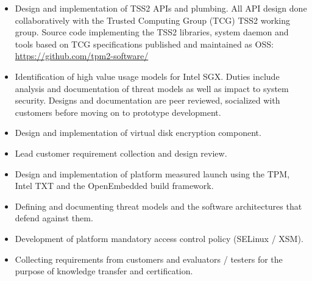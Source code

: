 \documentclass[letterpaper,11pt]{article}
\begin{document}
\begin {itemize}
  \setlength {\itemsep}{1pt}
  \setlength {\parskip}{0pt}
  \setlength {\parsep}{0pt}
  \item Design and implementation of TSS2 APIs and plumbing. All API
    design done collaboratively with the Trusted Computing Group (TCG)
    TSS2 working group. Source code implementing the TSS2 libraries,
    system daemon and tools based on TCG specifications published and
    maintained as OSS: \url{https://github.com/tpm2-software/}
  \item Identification of high value usage models for
    Intel\textsuperscript{\textregistered} SGX. Duties include analysis
    and documentation of threat models as well as impact to system
    security. Designs and documentation are peer reviewed, socialized
    with customers before moving on to prototype development.
\end {itemize}

\begin {itemize}
    \setlength {\itemsep}{1pt}
    \setlength {\parskip}{0pt}
    \setlength {\parsep}{0pt}
  \item Design and implementation of virtual disk encryption component.
  \item Lead customer requirement collection and design review.
\end {itemize}
\begin {itemize}
  \setlength {\itemsep}{1pt}
  \setlength {\parskip}{0pt}
  \setlength {\parsep}{0pt}
  \item Design and implementation of platform measured launch using the
    TPM, Intel\textsuperscript{\textregistered} TXT and the OpenEmbedded
    build framework.
  \item Defining and documenting threat models and the software
    architectures that defend against them.
  \item Development of platform mandatory access control policy (SELinux /
    XSM).
  \item Collecting requirements from customers and evaluators / testers
    for the purpose of knowledge transfer and certification.
\end {itemize}
\end{document}
